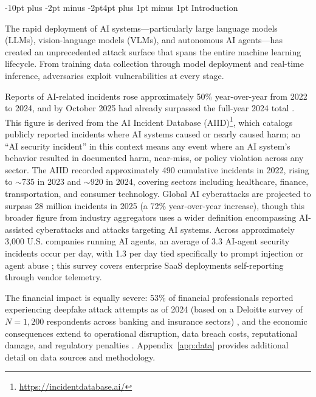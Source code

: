 \documentclass[conference]{IEEEtran}
\makeatletter
\renewcommand{\section}{\@startsection{section}{1}{\z@}%
  {-10pt plus -2pt minus -2pt}{4pt plus 1pt minus 1pt}%
  {\normalfont\large\bfseries\sffamily\color{accentdark}}}
\makeatother
\begin{document}
\section{Introduction}


The rapid deployment of AI systems---particularly large language models (LLMs), vision-language models (VLMs), and autonomous AI agents---has created an unprecedented attack surface that spans the entire machine learning lifecycle. From training data collection through model deployment and real-time inference, adversaries exploit vulnerabilities at every stage.

Reports of AI-related incidents rose approximately 50\% year-over-year from 2022 to 2024, and by October 2025 had already surpassed the full-year 2024 total \cite{time2025}. This figure is derived from the AI Incident Database (AIID)\footnote{\url{https://incidentdatabase.ai/}}, which catalogs publicly reported incidents where AI systems caused or nearly caused harm; an ``AI security incident'' in this context means any event where an AI system's behavior resulted in documented harm, near-miss, or policy violation across any sector. The AIID recorded approximately 490 cumulative incidents in 2022, rising to $\sim$735 in 2023 and $\sim$920 in 2024, covering sectors including healthcare, finance, transportation, and consumer technology. Global AI cyberattacks are projected to surpass 28 million incidents in 2025 (a 72\% year-over-year increase), though this broader figure from industry aggregators \cite{networkinstallers2025} uses a wider definition encompassing AI-assisted cyberattacks and attacks targeting AI systems. Across approximately 3,000 U.S. companies running AI agents, an average of 3.3 AI-agent security incidents occur per day, with 1.3 per day tied specifically to prompt injection or agent abuse \cite{capriola2025}; this survey covers enterprise SaaS deployments self-reporting through vendor telemetry.

The financial impact is equally severe: 53\% of financial professionals reported experiencing deepfake attack attempts as of 2024 (based on a Deloitte survey of $N{=}1,200$ respondents across banking and insurance sectors) \cite{techadv2025}, and the economic consequences extend to operational disruption, data breach costs, reputational damage, and regulatory penalties \cite{bosch2025}. Appendix~\ref{app:data} provides additional detail on data sources and methodology.
\end{document}

